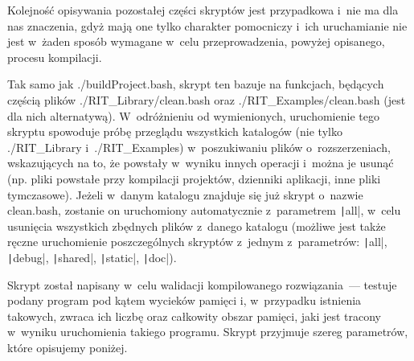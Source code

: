 Kolejność opisywania pozostałej części skryptów jest przypadkowa i~nie ma dla nas znaczenia, gdyż mają one tylko charakter pomocniczy i~ich uruchamianie nie jest w~żaden sposób wymagane w~celu przeprowadzenia, powyżej opisanego, procesu kompilacji.


Tak samo jak \textsf{./buildProject.bash}, skrypt ten bazuje na funkcjach, będących częścią plików \textsf{./RIT\_Library/clean.bash} oraz \textsf{./RIT\_Examples/clean.bash} (jest dla nich alternatywą).
W~odróżnieniu od wymienionych, uruchomienie tego skryptu spowoduje próbę przeglądu wszystkich katalogów (nie tylko \textsf{./RIT\_Library} i~\textsf{./RIT\_Examples}) w~poszukiwaniu plików o~rozszerzeniach, wskazujących na to, że powstały w~wyniku innych operacji i~można je usunąć (np. pliki powstałe przy kompilacji projektów, dzienniki aplikacji, inne pliki tymczasowe).
Jeżeli w~danym katalogu znajduje się już skrypt o~nazwie \textsf{clean.bash}, zostanie on uruchomiony automatycznie z~parametrem \texttt|all|, w~celu usunięcia wszystkich zbędnych plików z~danego katalogu (możliwe jest także ręczne uruchomienie poszczególnych skryptów z~jednym z~parametrów: \texttt|all|, \texttt|debug|, \texttt|shared|, \texttt|static|, \texttt|doc|).


Skrypt został napisany w~celu walidacji kompilowanego rozwiązania~--- testuje podany program pod kątem wycieków pamięci i, w~przypadku istnienia takowych, zwraca ich liczbę oraz całkowity obszar pamięci, jaki jest tracony w~wyniku uruchomienia takiego programu.
Skrypt przyjmuje szereg parametrów, które opisujemy poniżej.

